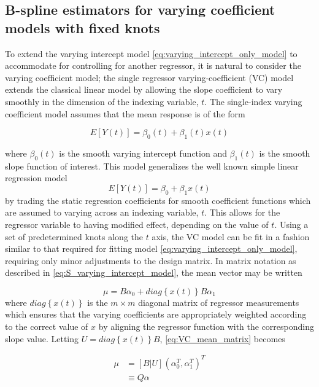 \documentclass[12pt]{article}
\begin{document}
\subsection{B-spline estimators for varying coefficient models with fixed knots}

To extend the varying intercept model \ref{eq:varying_intercept_only_model} to accommodate for controlling for another regressor, it is natural to consider the varying coefficient model; the single regressor varying-coefficient (VC) model extends the classical linear model by allowing the slope coefficient to vary smoothly in the dimension of the indexing variable, $t$.  The single-index varying coefficient model assumes that the mean response is of the form

\begin{equation} \label{eq:simplest_VC_model_mean}
E\left[ Y\left(t\right) \right] = \beta_0\left(t\right) + \beta_1\left(t\right)x\left(t\right)
\end{equation}

where $\beta_0\left(t\right)$ is the smooth varying intercept function and $\beta_1\left(t\right)$ is the smooth slope function of interest. This model generalizes the well known simple linear regression model 
\[
E\left[Y\left(t\right)\right] = \beta_0 + \beta_1 x\left(t\right)
\]
by trading the static regression coefficients for smooth coefficient functions which are assumed to varying across an indexing variable, $t$. This allows for the regressor variable to having modified effect, depending on the value of $t$. Using a set of predetermined knots along the $t$ axis, the VC model can be fit in a fashion similar to that required for fitting model \ref{eq:varying_intercept_only_model}, requiring only minor adjustments to the design matrix. In matrix notation as described in \ref{eq:S_varying_intercept_model}, the mean vector may be written

\begin{equation} \label{eq:VC_mean_matrix}
\mu = B\alpha_0 + diag\left\{x\left(t\right) \right\}B\alpha_1
\end{equation} 
\noindent
where $diag\left\{x\left(t\right) \right\}$ is the $m \times m$ diagonal matrix of regressor measurements which ensures that the varying coefficients are appropriately weighted according to the correct value of $x$ by aligning the regressor function with the corresponding slope value. Letting $U = diag\left\{x\left(t\right) \right\}B$, \ref{eq:VC_mean_matrix} becomes

\begin{align}
\mu &= \left[ B | U \right] \left(\alpha_0^T,\alpha_1^T\right)^T \\
&\equiv Q\alpha
\end{align} 
\end{document}
